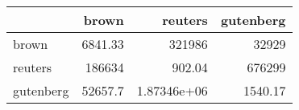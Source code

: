 \begin{tabular}{lrrr}
\hline
           &     brown &          reuters &   gutenberg \\
\hline
 brown     &   6841.33 & 321986           &    32929    \\
 reuters   & 186634    &    902.04        &   676299    \\
 gutenberg &  52657.7  &      1.87346e+06 &     1540.17 \\
\hline
\end{tabular}